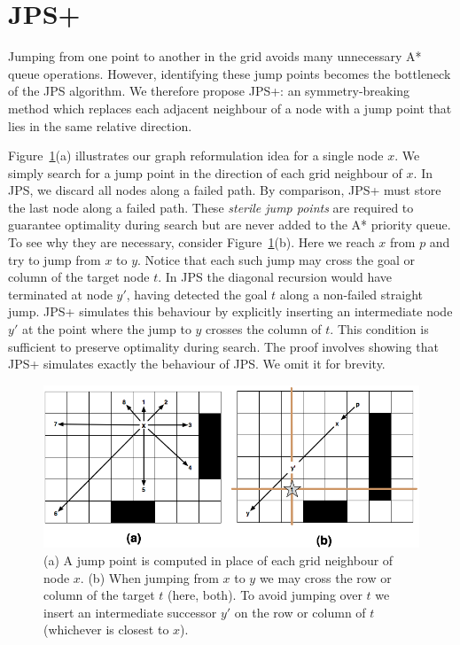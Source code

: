 \section{JPS+}
\label{sec:pre}
Jumping from one point to another in the grid
avoids many unnecessary A* queue operations. However, identifying 
these jump points becomes the bottleneck of the JPS algorithm. 
We therefore propose JPS+: an symmetry-breaking method which replaces
each adjacent neighbour of a node with a jump point that lies in the 
same relative direction.

Figure~\ref{fig:preproc}(a) illustrates our graph reformulation idea for a 
single node $x$. We simply search for a jump point in the direction
of each grid neighbour of $x$. In JPS, we discard all nodes along a failed
path. By comparison, JPS+ must store the last node along a failed path.
These \emph{sterile jump points} are required 
to guarantee optimality during search but are never added to the A* priority queue.
To see why they are necessary, consider Figure~\ref{fig:preproc}(b).
Here we reach $x$ from $p$ and try to jump from $x$ to $y$. 
Notice that each such jump may cross the goal or column of the target node
$t$. In JPS the diagonal recursion would have terminated at node $y'$, having detected
the goal $t$ along a non-failed straight jump.
JPS+ simulates this behaviour by explicitly inserting an intermediate node $y'$ 
at the point where the jump to $y$ crosses the column of $t$.
This condition is sufficient to preserve optimality during search. The proof
involves showing that JPS+ simulates exactly the behaviour of JPS. We omit it 
for brevity.

\begin{figure}[tb]
       \begin{center}
		   \includegraphics[width=0.95\columnwidth]
			{diagrams/preproc.png}
       \end{center}
	\vspace{-3pt}
       \caption{(a) A jump point is computed in place of each grid neighbour of node $x$.
		(b) When jumping from $x$ to $y$ we may cross the row or column of the target $t$ (here, both). 
To avoid jumping over $t$ we insert an intermediate successor $y'$ on the row or column of $t$ (whichever is closest to $x$).}

       \label{fig:preproc}
\end{figure}

%



